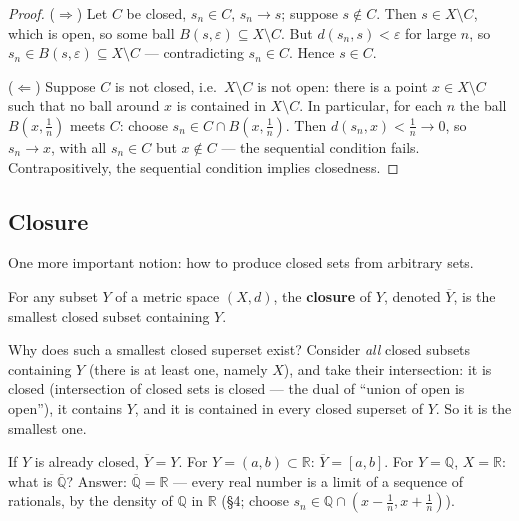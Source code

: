 \documentclass[11pt]{report}
\begin{document}
\begin{proof}
($\Rightarrow$) Let $C$ be closed, $s_n \in C$, $s_n \to s$; suppose $s \notin C$. Then $s \in X \setminus C$, which is open, so some ball $B(s, \varepsilon) \subseteq X \setminus C$. But $d(s_n, s) < \varepsilon$ for large $n$, so $s_n \in B(s,\varepsilon) \subseteq X \setminus C$ --- contradicting $s_n \in C$. Hence $s \in C$.

($\Leftarrow$) Suppose $C$ is not closed, i.e.\ $X \setminus C$ is not open: there is a point $x \in X \setminus C$ such that no ball around $x$ is contained in $X \setminus C$. In particular, for each $n$ the ball $B(x, \tfrac1n)$ meets $C$: choose $s_n \in C \cap B(x, \tfrac1n)$. Then $d(s_n, x) < \tfrac1n \to 0$, so $s_n \to x$, with all $s_n \in C$ but $x \notin C$ --- the sequential condition fails. Contrapositively, the sequential condition implies closedness.
\end{proof}

\subsection{Closure}

One more important notion: how to produce closed sets from arbitrary sets.

\begin{defbox}[Closure]
For any subset $Y$ of a metric space $(X,d)$, the \textbf{closure} of $Y$, denoted $\overline{Y}$, is the smallest closed subset containing $Y$.
\end{defbox}

Why does such a smallest closed superset exist? Consider \emph{all} closed subsets containing $Y$ (there is at least one, namely $X$), and take their intersection: it is closed (intersection of closed sets is closed --- the dual of ``union of open is open''), it contains $Y$, and it is contained in every closed superset of $Y$. So it is the smallest one.

\begin{exbox}
If $Y$ is already closed, $\overline{Y} = Y$. For $Y = (a,b) \subset \mathbb{R}$: $\overline{Y} = [a,b]$. For $Y = \mathbb{Q}$, $X = \mathbb{R}$: what is $\overline{\mathbb{Q}}$? Answer: $\overline{\mathbb{Q}} = \mathbb{R}$ --- every real number is a limit of a sequence of rationals, by the density of $\mathbb{Q}$ in $\mathbb{R}$ (\S 4; choose $s_n \in \mathbb{Q} \cap (x - \tfrac1n, x + \tfrac1n)$).
\end{exbox}
\end{document}
